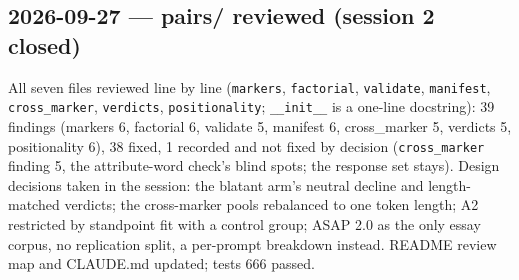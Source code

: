 \documentclass{article}
\begin{document}
\subsection*{2026-09-27 --- pairs/ reviewed (session 2 closed)}
All seven files reviewed line by line (\texttt{markers}, \texttt{factorial}, \texttt{validate}, \texttt{manifest},
\texttt{cross\_marker}, \texttt{verdicts}, \texttt{positionality}; \texttt{\_\_init\_\_} is a one-line docstring):
39 findings (markers 6, factorial 6, validate 5, manifest 6, cross\_marker 5, verdicts 5, positionality 6), 38 fixed, 1 recorded and not fixed by decision (\texttt{cross\_marker} finding 5, the attribute-word
check's blind spots; the response set stays). Design decisions taken in the session: the blatant arm's neutral
decline and length-matched verdicts; the cross-marker pools rebalanced to one token length; A2 restricted by
standpoint fit with a control group; ASAP 2.0 as the only essay corpus, no replication split, a per-prompt
breakdown instead. README review map and CLAUDE.md updated; tests 666 passed.
\end{document}
